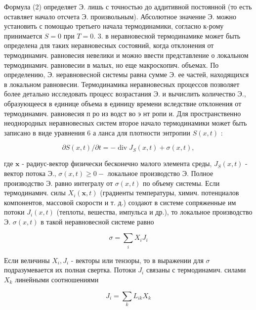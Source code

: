 \documentclass[10pt]{article}
\begin{document}
Формула (2) определяет Э. лишь с точностью до аддитивной постоянной (то есть оставляет начало отсчета Э. произвольным). Абсолютное значение Э. можно установить с помощью третьего начала термодинамики, согласно к-рому принимается $S=0$ при $T=0$. 3. в неравновесной термодинамике может быть определена для таких неравновесных состояний, когда отклонения от термодинамич. равновесия невелики и можно ввести представление о локальном термодинамич. равновесии в малых, но еще макроскопич. объемах. По определению, Э. неравновесной системы равна сумме Э. ее частей, находящихся в локальном равновесии. Термодинамика неравновесных процессов позволяет более детально исследовать процесс возрастания Э. и вычислить количество Э., образующееся в единице объема в единицу времени вследствие отклонения от термодинамич. равновесия п ро из водст во э нт ропи и. Для пространственно неоднородных неравновесных систем второе начало термодинамики может быть записано в виде уравнения 6 а ланса для плотности энтропии $S(x, t)$ :



\[

\partial S(x, t) / \partial t=-\operatorname{div} J_{S}(x, t)+\sigma(x, t),

\]



где $\boldsymbol{x}$ - радиус-вектор физически бесконечно малого элемента среды, $J_{S}(x, t)$ - вектор потока Э., $\sigma(x, t) \geqslant 0-$ локальное производство Э. Полное производство Э. равно интегралу от $\sigma(x, t)$ по объему системы. Если термодинамич. силы $X_{i}(\boldsymbol{x}, t)$ (градиенты температуры, химич. потенциалов компонентов, массовой скорости и т. д.) создают в системе сопряженные им потоки $J_{i}(x, t)$ (теплоты, вешества, импульса и др.), то локальное производство Э. $\sigma(x, t)$ в такой неравновесной системе равно



\[

\sigma=\sum_{i} X_{i} J_{i}

\]



Если величины $X_{i}, J_{i}$ - векторы или тензоры, то в выражении для $\sigma$ подразумевается их полная свертка. Потоки $J_{i}$ связаны с термодинамич. силами $X_{k}$ линейными соотношениями



\[

J_{i}=\sum_{k} L_{i k} X_{k}

\]
\end{document}
